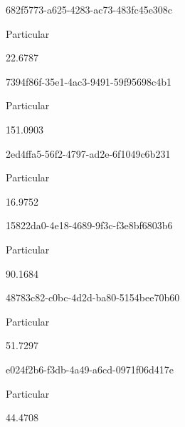 \documentclass[
  11pt,
  a4paper,
  DIV=11,
  numbers=noendperiod]{scrartcl}
\begin{document}
\n    

\n      

682f5773-a625-4283-ac73-483fc45e308c

\n      

Particular

\n      

22.6787

\n    

\n    

\n      

7394f86f-35e1-4ac3-9491-59f95698c4b1

\n      

Particular

\n      

151.0903

\n    

\n    

\n      

2ed4ffa5-56f2-4797-ad2e-6f1049c6b231

\n      

Particular

\n      

16.9752

\n    

\n    

\n      

15822da0-4e18-4689-9f3c-f3e8bf6803b6

\n      

Particular

\n      

90.1684

\n    

\n    

\n      

48783c82-c0bc-4d2d-ba80-5154bee70b60

\n      

Particular

\n      

51.7297

\n    

\n    

\n      

e024f2b6-f3db-4a49-a6cd-0971f06d417e

\n      

Particular

\n      

44.4708

\n    

\n    

\n      
\end{document}
